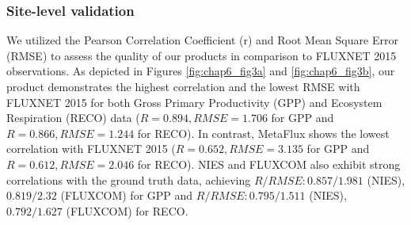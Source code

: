 \subsubsection*{Site-level validation}
We utilized the Pearson Correlation Coefficient (r) and Root Mean Square Error (RMSE) to assess the quality of our products in comparison to FLUXNET 2015 observations. As depicted in Figures \ref{fig:chap6_fig3a} and \ref{fig:chap6_fig3b}, our product demonstrates the highest correlation and the lowest RMSE with FLUXNET 2015 for both Gross Primary Productivity (GPP) and Ecosystem Respiration (RECO) data ($R = 0.894, RMSE = 1.706$ for GPP and $R = 0.866, RMSE = 1.244$ for RECO). In contrast, MetaFlux shows the lowest correlation with FLUXNET 2015 ($R = 0.652, RMSE = 3.135$ for GPP and $R = 0.612, RMSE = 2.046$ for RECO). NIES and FLUXCOM also exhibit strong correlations with the ground truth data, achieving $R/RMSE: 0.857/1.981$ (NIES), $0.819/2.32$ (FLUXCOM) for GPP and $R/RMSE: 0.795/1.511$ (NIES), $0.792/1.627$ (FLUXCOM) for RECO. \par


